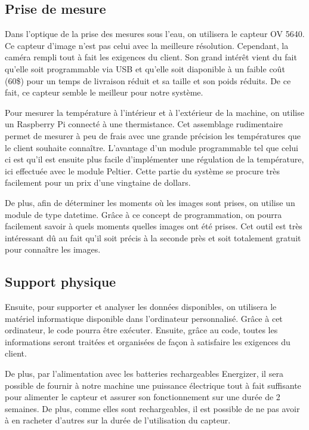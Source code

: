 \clearpage

\subsection{Prise de mesure}
Dans l'optique de la prise des mesures sous l'eau, on utilisera le capteur OV 5640. Ce capteur d'image n'est pas celui avec la meilleure résolution. Cependant, la caméra rempli tout à fait les exigences du client. Son grand intérêt vient du fait qu'elle soit programmable via USB et qu'elle soit diaponible à un faible coût (60\$) pour un temps de livraison réduit et sa taille et son poids réduits. De ce fait, ce capteur semble le meilleur pour notre système. 


Pour mesurer la température à l'intérieur et à l'extérieur de la machine, on utilise un Raspberry Pi connecté à une thermistance. Cet assemblage rudimentaire permet de mesurer à peu de frais avec une grande précision les températures que le client souhaite connaître. L'avantage d'un module programmable tel que celui ci est qu'il est ensuite plus facile d'implémenter une régulation de la température, ici effectuée avec le module Peltier. Cette partie du système se procure très facilement pour un prix d'une vingtaine de dollars.


De plus, afin de déterminer les moments où les images sont prises, on utilise un module de type datetime. Grâce à ce concept de programmation, on pourra facilement savoir à quels moments quelles images ont été prises. Cet outil est très intéressant dû au fait qu'il soit précis à la seconde près et soit totalement gratuit pour connaître les images.

\subsection{Support physique}
Ensuite, pour supporter et analyser les données disponibles, on utilisera le matériel informatique disponible dans l'ordinateur personnalisé. Grâce à cet ordinateur, le code pourra être exécuter. Ensuite, grâce au code, toutes les informations seront traitées et organisées de façon à satisfaire les exigences du client.

De plus, par l'alimentation avec les batteries rechargeables Energizer, il sera possible de fournir à notre machine une puissance électrique tout à fait suffisante pour alimenter le capteur et assurer son fonctionnement sur une durée de 2 semaines. De plus, comme elles sont rechargeables, il est possible de ne pas avoir à en racheter d'autres sur la durée de l'utilisation du capteur.

